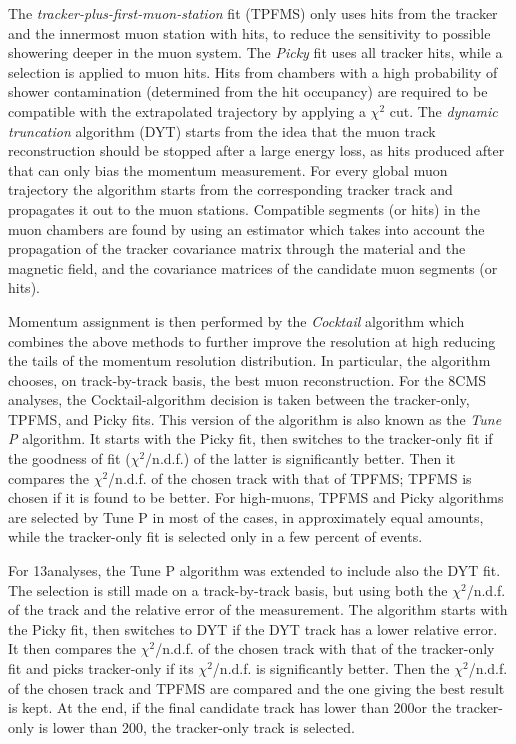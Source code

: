 The {\it tracker-plus-first-muon-station} fit (TPFMS) only uses hits from the tracker and the innermost muon station with hits, to reduce the sensitivity to possible showering deeper in the muon system. The {\it Picky} fit uses all tracker hits, while a selection is applied to muon hits. Hits from chambers with a high probability of shower contamination (determined from the hit occupancy) are required to be compatible with the extrapolated trajectory by applying a $\chi^2$ cut. The {\it dynamic truncation} algorithm (DYT) starts from the idea that the muon track reconstruction should be stopped after a large energy loss, as hits produced after that can only bias the momentum measurement. For every global muon trajectory the algorithm starts from the corresponding tracker track and propagates it out to the muon stations. Compatible segments (or hits) in the muon chambers are found by using an estimator which takes into account the propagation of the tracker covariance matrix through the material and the magnetic field, and the covariance matrices of the candidate muon segments (or hits).

Momentum assignment is then performed by the {\it Cocktail} algorithm which combines the above methods to further improve the resolution at high \pt reducing the tails of the momentum resolution distribution.
In particular, the algorithm chooses, on track-by-track basis, the best muon reconstruction. For the 8\TeV CMS analyses, the Cocktail-algorithm decision is taken between the tracker-only, TPFMS, and Picky fits. 
This version of the algorithm is also known as the {\it Tune P} algorithm. It starts with the Picky fit, then switches to the tracker-only fit if the goodness of fit ($\chi^2$/n.d.f.) of the latter is significantly better. Then it compares the $\chi^2$/n.d.f. of the chosen track with that of TPFMS; TPFMS is chosen if it is found to be better. For high-\pt muons, TPFMS and Picky algorithms are selected by Tune P in most of the cases, in approximately equal amounts, while the tracker-only fit is selected only in a few percent of events. 

For 13\TeV analyses, the Tune P algorithm was extended to include also the DYT fit. The selection is still made on a track-by-track basis, but using both the $\chi^2$/n.d.f. of the track and the relative error of the \pt measurement. The algorithm starts with the Picky fit, then switches to DYT if the DYT track has a lower relative \pt error. It then compares the $\chi^2$/n.d.f. of the chosen track with that of the tracker-only fit and picks tracker-only if its $\chi^2$/n.d.f. is significantly better. Then the $\chi^2$/n.d.f. of the chosen track and TPFMS are compared and the one giving the best result is kept. At the end, if the final candidate track has \pt lower than 200\GeV or the tracker-only \pt is lower than 200\GeV, the tracker-only track is selected.%

